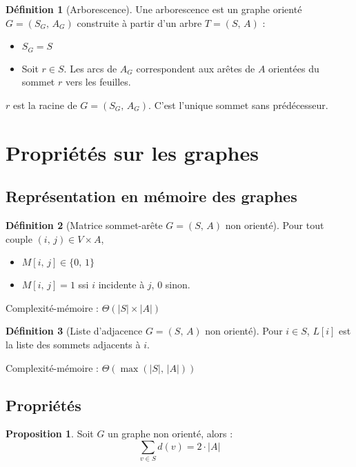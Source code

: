 \documentclass[11pt,english,french]{scrreprt}
\theoremstyle{remark}
\theoremstyle{definition}
\newtheorem*{def*}{Définition}
\newtheorem*{prop*}{Proposition}
\begin{document}
\begin{def*}[Arborescence]
	Une arborescence est un graphe orienté $G=(S_G,\,A_G)$ construite à partir d'un arbre $T=(S,\,A)$ : \begin{itemize}
		\item $S_G=S$
		\item Soit $r\in S$. Les arcs de $A_G$ correspondent aux arêtes de $A$ orientées du sommet $r$ vers les feuilles.
	\end{itemize}
	$r$ est la racine de $G=(S_G,\,A_G)$. C'est l'unique sommet sans prédécesseur.
\end{def*}

\section{Propriétés sur les graphes} %

\subsection{Représentation en mémoire des graphes} %

\begin{def*}[Matrice sommet-arête $G=(S,\,A)$ non orienté]
	Pour tout couple $(i,\,j)\in V\times A$, \begin{itemize}
		\item $M[i,\,j]\in \{0,\,1\}$
		\item $M[i,\,j]=1$ ssi $i$ incidente à $j$, 0 sinon.
	\end{itemize}
	
	Complexité-mémoire : $\Theta(|S|\times |A|)$
\end{def*}

\begin{def*}[Liste d'adjacence $G=(S,\,A)$ non orienté]
	Pour $i\in S$, $L[i]$ est la liste des sommets adjacents à $i$.
	
	Complexité-mémoire : $\Theta(\max(|S|,\,|A|))$
\end{def*}

\subsection{Propriétés} %

\begin{prop*}
	Soit $G$ un graphe non orienté, alors :
	\begin{displaymath}
		\sum_{v\in S}d(v) = 2\cdot|A|
	\end{displaymath}
\end{prop*}
\end{document}
